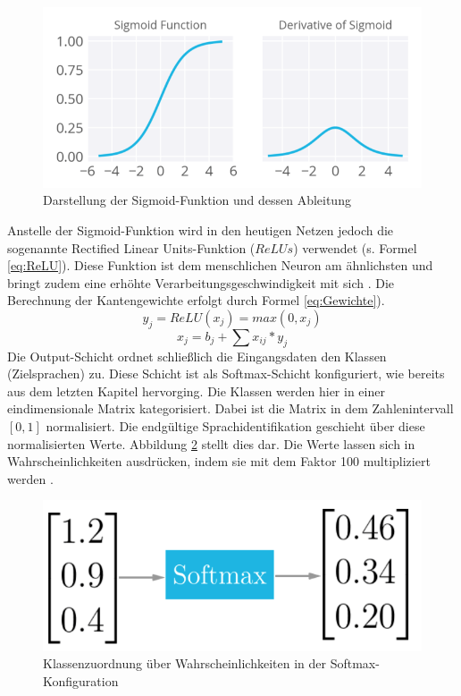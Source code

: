 \begin{figure}[h!]
	\centering
	\includegraphics[width=1.0\linewidth]{images/sigmund}
	\caption{Darstellung der Sigmoid-Funktion und dessen Ableitung \cite{Kulbear.2017}} %
	\label{fig:features11.0}
\end{figure}
Anstelle der Sigmoid-Funktion wird in den heutigen Netzen jedoch die sogenannte Rectified Linear Units-Funktion ($ReLUs$) verwendet (s. Formel \ref{eq:ReLU}). Diese Funktion ist dem menschlichen Neuron am ähnlichsten und bringt zudem eine erhöhte Verarbeitungsgeschwindigkeit mit sich \cite{zeiler.2013}. Die Berechnung der Kantengewichte erfolgt durch Formel \ref{eq:Gewichte}).
\begin{equation}
y_{j} = ReLU(x_{j}) = max(0,x_{j}) 
\label{eq:ReLU}
\end{equation}
\begin{equation}
x_{ j } = b_{ j } + \sum{ }{ }{ x_{ ij } * y_{j}}
\label{eq:Gewichte}
\end{equation}
Die Output-Schicht ordnet schließlich die Eingangsdaten den Klassen (Zielsprachen) zu. Diese Schicht ist als Softmax-Schicht konfiguriert, wie bereits aus dem letzten Kapitel hervorging. Die Klassen werden hier in einer eindimensionale Matrix kategorisiert. Dabei ist die Matrix in dem Zahlenintervall $[0,1]$ normalisiert. Die endgültige Sprachidentifikation geschieht über diese normalisierten Werte. Abbildung \ref{fig:soft} stellt dies dar. Die Werte lassen sich in Wahrscheinlichkeiten ausdrücken, indem sie mit dem Faktor 100 multipliziert werden \cite{Kulbear.2017}.
\begin{figure}[h!]
	\centering
	\includegraphics[width=0.7\linewidth]{images/softmax}
	\caption{Klassenzuordnung über Wahrscheinlichkeiten in der Softmax-Konfiguration \cite{Kulbear.2017}} %
	\label{fig:soft}
\end{figure}
